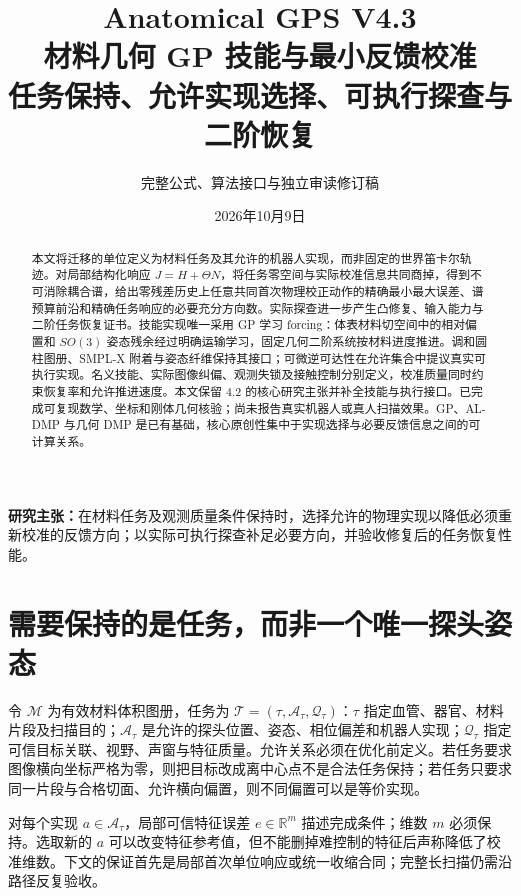 \documentclass[11pt,a4paper]{article}
\numberwithin{equation}{section}
\theoremstyle{definition}
\newcommand{\R}{\mathbb R}
\begin{document}
\title{Anatomical GPS V4.3\\[2mm]\Large 材料几何 GP 技能与最小反馈校准\\[2mm]\large 任务保持、允许实现选择、可执行探查与二阶恢复}
\author{完整公式、算法接口与独立审读修订稿}
\date{2026年10月9日}
\maketitle
\begin{abstract}
本文将迁移的单位定义为材料任务及其允许的机器人实现，而非固定的世界笛卡尔轨迹。对局部结构化响应 $J=H+\Theta N$，将任务零空间与实际校准信息共同商掉，得到不可消除耦合谱，给出零残差历史上任意共同首次物理校正动作的精确最小最大误差、谱预算前沿和精确任务响应的必要充分方向数。实际探查进一步产生凸修复、输入能力与二阶任务恢复证书。技能实现唯一采用 GP 学习 forcing：体表材料切空间中的相对偏置和 $SO(3)$ 姿态残余经过明确运输学习，固定几何二阶系统按材料进度推进。调和圆柱图册、SMPL-X 附着与姿态纤维保持其接口；可微逆可达性在允许集合中提议真实可执行实现。名义技能、实际图像纠偏、观测失锁及接触控制分别定义，校准质量同时约束恢复率和允许推进速度。本文保留 4.2 的核心研究主张并补全技能与执行接口。已完成可复现数学、坐标和刚体几何核验；尚未报告真实机器人或真人扫描效果。GP、AL-DMP 与几何 DMP 是已有基础，核心原创性集中于实现选择与必要反馈信息之间的可计算关系。
\end{abstract}
\noindent\textbf{研究主张：}在材料任务及观测质量条件保持时，选择允许的物理实现以降低必须重新校准的反馈方向；以实际可执行探查补足必要方向，并验收修复后的任务恢复性能。
\newpage
\begingroup
\footnotesize
\setlength{\parskip}{0pt}
\tableofcontents
\endgroup
\newpage

\section{需要保持的是任务，而非一个唯一探头姿态}
令 $\mathcal M$ 为有效材料体积图册，任务为 $\mathcal T=(\tau,\mathcal A_\tau,\mathcal Q_\tau)$：$\tau$ 指定血管、器官、材料片段及扫描目的；$\mathcal A_\tau$ 是允许的探头位置、姿态、相位偏差和机器人实现；$\mathcal Q_\tau$ 指定可信目标关联、视野、声窗与特征质量。允许关系必须在优化前定义。若任务要求图像横向坐标严格为零，则把目标改成离中心点不是合法任务保持；若任务只要求同一片段与合格切面、允许横向偏置，则不同偏置可以是等价实现。

对每个实现 $a\in\mathcal A_\tau$，局部可信特征误差 $e\in\R^m$ 描述完成条件；维数 $m$ 必须保持。选取新的 $a$ 可以改变特征参考值，但不能删掉难控制的特征后声称降低了校准维数。下文的保证首先是局部首次单位响应或统一收缩合同；完整长扫描仍需沿路径反复验收。
\end{document}
